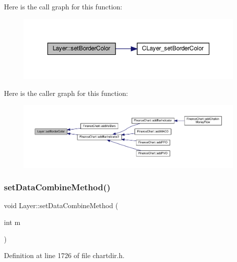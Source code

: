 Here is the call graph for this function\+:
\nopagebreak
\begin{figure}[H]
\begin{center}
\leavevmode
\includegraphics[width=347pt]{class_layer_a5ca95189af8b33edce8e9a6bf28259b1_cgraph}
\end{center}
\end{figure}
Here is the caller graph for this function\+:
\nopagebreak
\begin{figure}[H]
\begin{center}
\leavevmode
\includegraphics[width=350pt]{class_layer_a5ca95189af8b33edce8e9a6bf28259b1_icgraph}
\end{center}
\end{figure}
\mbox{\label{class_layer_a147a8f0cb1c34a9d778a285cbc2d5fba}} 
\subsubsection{\texorpdfstring{set\+Data\+Combine\+Method()}{setDataCombineMethod()}}
{\footnotesize\ttfamily void Layer\+::set\+Data\+Combine\+Method (\begin{DoxyParamCaption}\item[{int}]{m }\end{DoxyParamCaption})\hspace{0.3cm}{\ttfamily [inline]}}



Definition at line 1726 of file chartdir.\+h.

